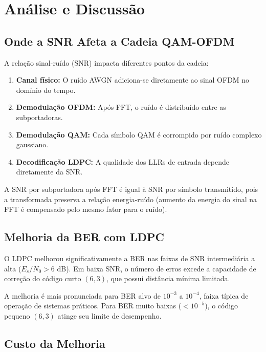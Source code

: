 \documentclass[conference]{IEEEtran}
\begin{document}
\section{Análise e Discussão}

\subsection{Onde a SNR Afeta a Cadeia QAM-OFDM}

A relação sinal-ruído (SNR) impacta diferentes pontos da cadeia:

\begin{enumerate}
    \item \textbf{Canal físico:} O ruído AWGN adiciona-se diretamente ao sinal OFDM no domínio do tempo.
    \item \textbf{Demodulação OFDM:} Após FFT, o ruído é distribuído entre as subportadoras.
    \item \textbf{Demodulação QAM:} Cada símbolo QAM é corrompido por ruído complexo gaussiano.
    \item \textbf{Decodificação LDPC:} A qualidade dos LLRs de entrada depende diretamente da SNR.
\end{enumerate}

A SNR por subportadora após FFT é igual à SNR por símbolo transmitido, pois a transformada preserva a relação energia-ruído (aumento da energia do sinal na FFT é compensado pelo mesmo fator para o ruído).

\subsection{Melhoria da BER com LDPC}

O LDPC melhorou significativamente a BER nas faixas de SNR intermediária a alta ($E_s/N_0 > 6$ dB). Em baixa SNR, o número de erros excede a capacidade de correção do código curto $(6,3)$, que possui distância mínima limitada.

A melhoria é mais pronunciada para BER alvo de $10^{-3}$ a $10^{-4}$, faixa típica de operação de sistemas práticos. Para BER muito baixas ($< 10^{-5}$), o código pequeno $(6,3)$ atinge seu limite de desempenho.

\subsection{Custo da Melhoria}
\end{document}
